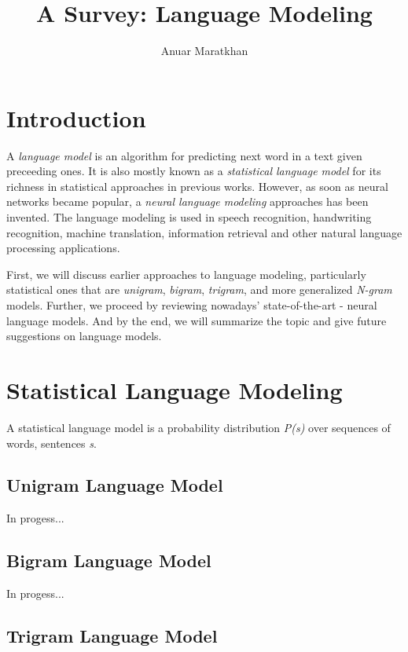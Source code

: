 \documentclass{IEEEtran}
\begin{document}
\title{A Survey: Language Modeling}

\author{Anuar Maratkhan}

\maketitle

\section{Introduction}

A \textit{language model} is an algorithm for predicting next word in a text given preceeding ones. It is also mostly known as a \textit{statistical language model} for its richness in statistical approaches in previous works. However, as soon as neural networks became popular, a \textit{neural language modeling} approaches has been invented. The language modeling is used in speech recognition, handwriting recognition, machine translation, information retrieval and other natural language processing applications.

First, we will discuss earlier approaches to language modeling, particularly statistical ones that are \textit{unigram}, \textit{bigram}, \textit{trigram}, and more generalized \textit{N-gram} models. Further, we proceed by reviewing nowadays' state-of-the-art - neural language models. And by the end, we will summarize the topic and give future suggestions on language models.


\section{Statistical Language Modeling}

A statistical language model is a probability distribution \textit{P(s)} over sequences of words, sentences \textit{s}\cite{slm}.

\subsection{Unigram Language Model}

In progess...

\subsection{Bigram Language Model}

In progess...

\subsection{Trigram Language Model}
\end{document}

